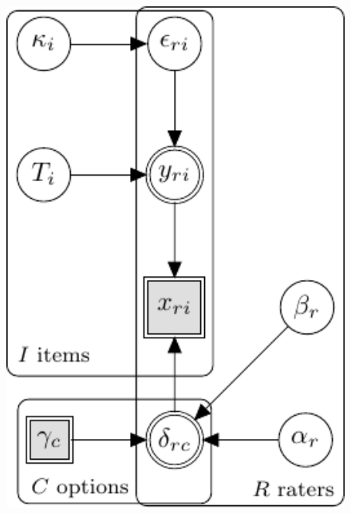 \documentclass{article}
\newcommand{\DON}[1] {\todo[inline, color=white]{Don: {#1}}}
\newcommand{\Irater}{r}
\newcommand{\Iitem}{i}
\newcommand{\Incat}{c}
\begin{document}
\begin{figure}[!ht]
	\begin{minipage}{0.5\textwidth}
		\centering
		\centering
		\includegraphics[width=1\textwidth, page=3]{graphicalModels/graphicalModels.pdf}
	\end{minipage}\hfill
\begin{minipage}{0.5\textwidth}
{\large
	\begin{align*}

\end{align*}}
\end{minipage}
\end{figure}
\end{document}
